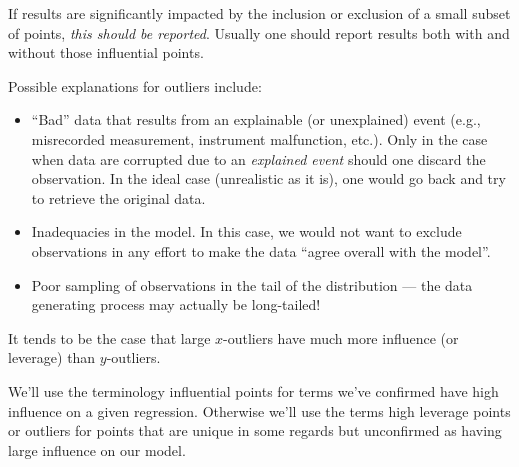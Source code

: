 \documentclass[
  letterpaper,
  DIV=11,
  numbers=noendperiod]{scrreport}
\providecommand{\tightlist}{%
  \setlength{\itemsep}{0pt}\setlength{\parskip}{0pt}}\usepackage{longtable,booktabs,array}
\begin{document}
If results are significantly impacted by the inclusion or exclusion of a
small subset of points, \emph{this should be reported}. Usually one
should report results both with and without those influential points.

Possible explanations for outliers include:

\begin{itemize}
\tightlist
\item
  ``Bad'' data that results from an explainable (or unexplained) event
  (e.g., misrecorded measurement, instrument malfunction, etc.). Only in
  the case when data are corrupted due to an \emph{explained event}
  should one discard the observation. In the ideal case (unrealistic as
  it is), one would go back and try to retrieve the original data.
\item
  Inadequacies in the model. In this case, we would not want to exclude
  observations in any effort to make the data ``agree overall with the
  model''.
\item
  Poor sampling of observations in the tail of the distribution --- the
  data generating process may actually be long-tailed!
\end{itemize}

It tends to be the case that large \(x\)-outliers have much more
influence (or leverage) than \(y\)-outliers.

We'll use the terminology {influential points} for terms we've confirmed
have high influence on a given regression. Otherwise we'll use the terms
{high leverage points} or {outliers} for points that are unique in some
regards but unconfirmed as having large influence on our model.
\end{document}
